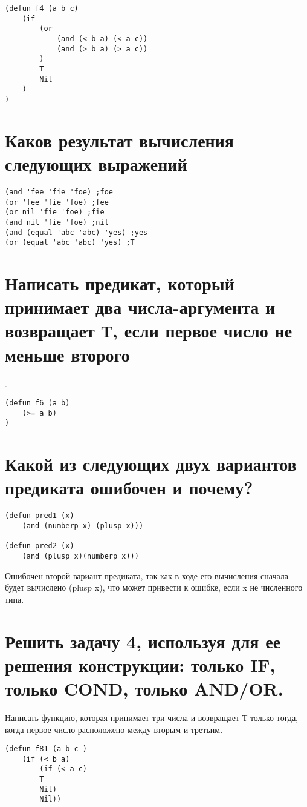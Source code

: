 \documentclass[a4paper, 14pt, unknownkeysallowed]{extreport}
\begin{document}
\begin{lstlisting}
(defun f4 (a b c)
	(if 
		(or
			(and (< b a) (< a c))
			(and (> b a) (> a c))
		)
		T
		Nil
	)
)
\end{lstlisting}

\section{Каков результат вычисления следующих выражений}

\begin{lstlisting}
(and 'fee 'fie 'foe) ;foe
(or 'fee 'fie 'foe) ;fee
(or nil 'fie 'foe) ;fie
(and nil 'fie 'foe) ;nil
(and (equal 'abc 'abc) 'yes) ;yes
(or (equal 'abc 'abc) 'yes) ;T
\end{lstlisting}


\section{Написать предикат, который принимает два числа-аргумента и возвращает Т, если первое число не меньше второго}.

\begin{lstlisting}
(defun f6 (a b) 
	(>= a b)
)
\end{lstlisting} 

\section{Какой из следующих двух вариантов предиката ошибочен и почему?}

\begin{lstlisting}
(defun pred1 (x)
	(and (numberp x) (plusp x)))

(defun pred2 (x)
	(and (plusp x)(numberp x)))
\end{lstlisting} 

Ошибочен второй вариант предиката, так как в ходе его вычисления сначала будет вычислено (plusp x), что может привести к ошибке, если x не численного типа.

\section{Решить задачу 4, используя для ее решения конструкции: только IF, только COND, только AND/OR.}
Написать функцию, которая принимает три числа и возвращает Т только тогда, когда первое число расположено между вторым и третьим.
\begin{lstlisting}
(defun f81 (a b c )
	(if (< b a)
		(if (< a c)
		T
		Nil)
		Nil))
\end{lstlisting} 
\end{document}
